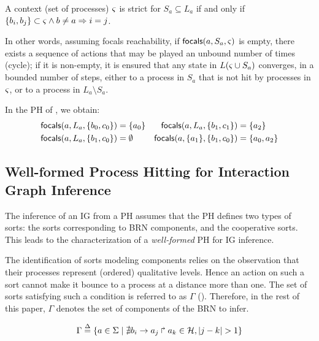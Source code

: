 \begin{definition}\label{def:strict-ctx}
A context (set of processes) $\varsigma$ is strict for $S_a\subseteq L_a$ if and only if
$\{b_i,b_j\} \subset \varsigma \wedge b\neq a \Rightarrow i=j$.
\end{definition}

In other words, assuming focals reachability, if $\mathsf{focals}(a,S_a,\varsigma)$ is empty, there exists a
sequence of actions that may be played an unbound number of times (cycle);
if it is non-empty, it is ensured that any state in $L(\varsigma\cup S_a)$ converges, in a bounded
number of steps, either to a process in $S_a$ that is not hit by processes in $\varsigma$, or to a process in
$L_a\setminus S_a$.

\begin{example}
In the PH of , we obtain:
\begin{align*}
\mathsf{focals}(a,L_a,\{b_0,c_0\}) &= \{ a_0 \}
&
\mathsf{focals}(a,L_a,\{b_1,c_1\}) &= \{ a_2 \}
\\
\mathsf{focals}(a,L_a,\{b_1,c_0\}) &= \emptyset
&
\mathsf{focals}(a,\{a_1\},\{b_1,c_0\}) &= \{ a_0, a_2 \}
\end{align*}
\end{example}



\subsection{Well-formed Process Hitting for Interaction Graph Inference}\label{ssec:wf}

The inference of an IG from a PH assumes that the PH defines two types of sorts:
the sorts corresponding to BRN components, and the cooperative sorts.
This leads to the characterization of a \emph{well-formed} PH for IG inference.

The identification of sorts modeling components relies on the observation that their processes
represent (ordered) qualitative levels.
Hence an action on such a sort cannot make it bounce to a process at a distance more than one.
The set of sorts satisfying such a condition is referred to as $\Gamma$
().
Therefore, in the rest of this paper, $\Gamma$ denotes the set of components of the BRN to infer.

\begin{equation}
\Gamma \stackrel{\Delta}= \{a \in \Sigma \mid \nexists b_i\rightarrow a_j\Rsh a_k \in \mathcal{H}, |j - k| > 1\} \\
\label{eq:PH-components}
\end{equation}


